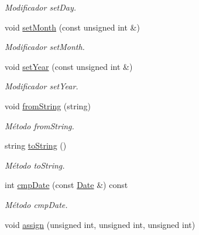 \begin{DoxyCompactItemize}
\begin{DoxyCompactList}\small\item\em Modificador set\+Day. \end{DoxyCompactList}\item 
void \hyperlink{class_date_aae207cd9f5441ca419502bb5ae030a4d}{set\+Month} (const unsigned int \&)\hypertarget{class_date_aae207cd9f5441ca419502bb5ae030a4d}{}\label{class_date_aae207cd9f5441ca419502bb5ae030a4d}

\begin{DoxyCompactList}\small\item\em Modificador set\+Month. \end{DoxyCompactList}\item 
void \hyperlink{class_date_a2cf1e3a04b1ca6a0fa94430be5f8c5eb}{set\+Year} (const unsigned int \&)\hypertarget{class_date_a2cf1e3a04b1ca6a0fa94430be5f8c5eb}{}\label{class_date_a2cf1e3a04b1ca6a0fa94430be5f8c5eb}

\begin{DoxyCompactList}\small\item\em Modificador set\+Year. \end{DoxyCompactList}\item 
void \hyperlink{class_date_a4ca1e1caba11928c842f6c62a2c851ab}{from\+String} (string)\hypertarget{class_date_a4ca1e1caba11928c842f6c62a2c851ab}{}\label{class_date_a4ca1e1caba11928c842f6c62a2c851ab}

\begin{DoxyCompactList}\small\item\em Método from\+String. \end{DoxyCompactList}\item 
string \hyperlink{class_date_adebdb45904dc2fbfacc66aa7528e0c04}{to\+String} ()
\begin{DoxyCompactList}\small\item\em Método to\+String. \end{DoxyCompactList}\item 
int \hyperlink{class_date_a6b90dc5b28b40c59af3758aeaf6edc12}{cmp\+Date} (const \hyperlink{class_date}{Date} \&) const 
\begin{DoxyCompactList}\small\item\em Método cmp\+Date. \end{DoxyCompactList}\item 
void \hyperlink{class_date_a2ad9e0b62b3abea9c9d471373ce5fdef}{assign} (unsigned int, unsigned int, unsigned int)\hypertarget{class_date_a2ad9e0b62b3abea9c9d471373ce5fdef}{}\label{class_date_a2ad9e0b62b3abea9c9d471373ce5fdef}


\end{DoxyCompactItemize}
